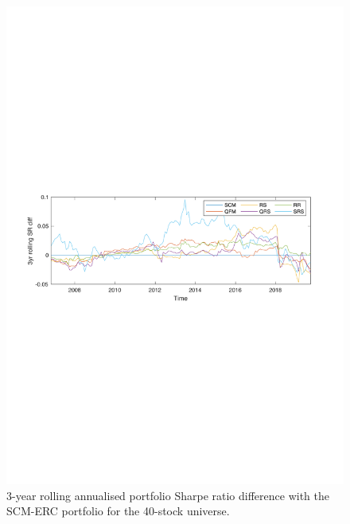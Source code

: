 \documentclass[a4paper,11pt,nocenter,bold,noupper,headcount]{mythesis}
\theoremstyle{plain}
\theoremstyle{definition}
\begin{document}
\begin{figure}[H]
\includegraphics[width=14.5cm]{n40_3yr_roll_sr.pdf}
\caption{3-year rolling annualised portfolio Sharpe ratio difference with the SCM-ERC portfolio for the 40-stock universe.}
\label{ERC_comp_40}
\end{figure}
\end{document}
